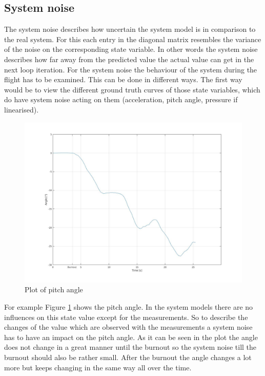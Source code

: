 \subsection{System noise}
The system noise describes how uncertain the system model is in comparison to the real system.
For this each entry in the diagonal matrix resembles the variance of the noise on the corresponding state variable.
In other words the system noise describes how far away from the predicted value the actual value can get in the next loop iteration.
For the system noise the behaviour of the system during the flight has to be examined.
This can be done in different ways.
The first way would be to view the different ground truth curves of those state variables,
which do have system noise acting on them (acceleration, pitch angle, pressure if linearised).
\begin{figure}[h]
 \centering
 \includegraphics[width=.8\textwidth]{./Pictures/PitchAnglePlot.jpg}
 \caption{Plot of pitch angle}
 \label{fig:PitchAnglePlot}
\end{figure}
For example Figure \ref{fig:PitchAnglePlot} shows the pitch angle.
In the system models there are no influences on this state value except for the measurements.
So to describe the changes of the value which are observed with the measurements a system noise has to have an impact on the pitch angle.
As it can be seen in the plot the angle does not change in a great manner until the burnout so the system noise till the burnout should also be rather small.
After the burnout the angle changes a lot more but keeps changing in the same way all over the time. \\

